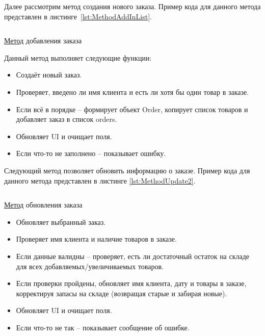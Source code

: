 \documentclass[12pt]{article}
\newcommand{\colorGIT}[1]{\textcolor{CtpLavender}{#1}}
\renewcommand{\texttt}[1]{{\small\ttfamily #1}}
\numberwithin{listing}{section}
\numberwithin{figure}{section}
\begin{document}
{}

Далее рассмотрим метод создания нового заказа. Пример кода для данного метода
представлен в листинге~\ref{lst:MethodAddInList}.

\begin{listing}[H]
	\inputminted[firstline=186, lastline=216]{csharp}{../../3lab/StoreManager/MainWindow.xaml.cs}
	\caption{\colorGIT{\href{https://github.com/WebMasterIT/Csharp_Labs/blob/ec375afd16c0647b337cf3d8a79c8bef904fc1be/3lab/StoreManager/MainWindow.xaml.cs\#L186-L216}{Метод}} добавления заказа}
	\label{lst:MethodAddInList}
\end{listing}

\noindent Данный метод выполняет следующие функции:
\begin{itemize}
	\item Создаёт новый заказ.
	\item Проверяет, введено ли имя клиента и есть ли хотя бы один товар в заказе.
	\item Если всё в порядке -- формирует объект \texttt{Order}, копирует список товаров и добавляет заказ в список \texttt{orders}.
	\item Обновляет \texttt{UI} и очищает поля.
	\item Если что-то не заполнено -- показывает ошибку.
\end{itemize}

Следующий метод позволяет обновить информацию о заказе. Пример кода для данного метода представлен в листинге \ref{lst:MethodUpdate2}.

\begin{listing}[H]
	\inputminted[firstline=218, lastline=266]{csharp}{../../3lab/StoreManager/MainWindow.xaml.cs}
	\caption{\colorGIT{\href{https://github.com/WebMasterIT/Csharp_Labs/blob/ec375afd16c0647b337cf3d8a79c8bef904fc1be/3lab/StoreManager/MainWindow.xaml.cs\#L218-L266}{Метод}} обновления заказа}
	\label{lst:MethodUpdate2}
\end{listing}

\begin{itemize}
	\item Обновляет выбранный заказ.
	\item Проверяет имя клиента и наличие товаров в заказе.
	\item Если данные валидны -- проверяет, есть ли достаточный остаток на складе для всех добавляемых/увеличиваемых товаров.
	\item Если проверки пройдены, обновляет имя клиента, дату и товары в заказе, корректируя запасы на складе (возвращая старые и забирая новые).
	\item Обновляет \texttt{UI} и очищает поля.
	\item Если что-то не так -- показывает сообщение об ошибке.
\end{itemize}
\end{document}
